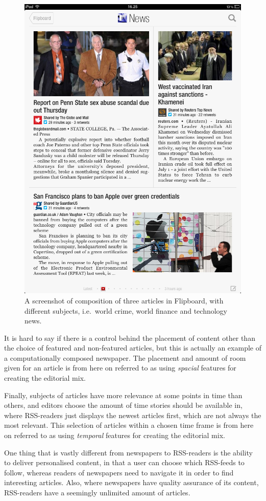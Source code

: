 \begin{figure}[h!tp]
 	\begin{center}
 		\includegraphics[width=.45\textwidth]{img/flipboard2}
 	\end{center}
 	\caption{A screenshot of composition of three articles in Flipboard, with different subjects, i.e.\ world crime, world finance and technology news.}
 	\label{fig:flipboard-screenshot}
\end{figure}


It is hard to say if there is a control behind the placement of content other than the choice of featured and non-featured articles, but this is actually an example of a computationally composed newspaper. The placement and amount of room given for an article is from here on referred to as using \emph{spacial} features for creating the editorial mix.

Finally, subjects of articles have more relevance at some points in time than others, and editors choose the amount of time stories should be available in, where RSS-readers just displays the newest articles first, which are not always the most relevant. This selection of articles within a chosen time frame is from here on referred to as using \emph{temporal} features for creating the editorial mix.

One thing that is vastly different from newspapers to RSS-readers is the ability to deliver personalised content, in that a user can choose which RSS-feeds to follow, whereas readers of newspapers need to navigate it in order to find interesting articles. Also, where newspapers have quality assurance of its content, RSS-readers have a seemingly unlimited amount of articles.

